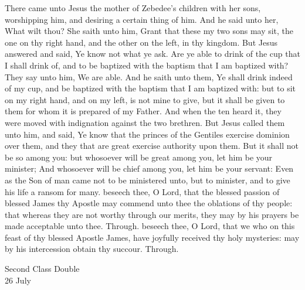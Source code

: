\vspace{0.5ex}
\vspace{-1ex}
 There came unto Jesus the mother of Zebedee's children with her sons, worshipping him, and desiring a certain thing of him. And he said unto her, What wilt thou? She saith unto him, Grant that these my two sons may sit, the one on thy right hand, and the other on the left, in thy kingdom. But Jesus answered and said, Ye know not what ye ask. Are ye able to drink of the cup that I shall drink of, and to be baptized with the baptism that I am baptized with? They say unto him, We are able. And he saith unto them, Ye shall drink indeed of my cup, and be baptized with the baptism that I am baptized with: but to sit on my right hand, and on my left, is not mine to give, but it shall be given to them for whom it is prepared of my Father. And when the ten heard it, they were moved with indignation against the two brethren. But Jesus called them unto him, and said, Ye know that the princes of the Gentiles exercise dominion over them, and they that are great exercise authority upon them. But it shall not be so among you: but whosoever will be great among you, let him be your minister; And whosoever will be chief among you, let him be your servant: Even as the Son of man came not to be ministered unto, but to minister, and to give his life a ransom for many.
\secret
{} beseech thee, O Lord, that the blessed passion of blessed James thy Apostle may commend unto thee the oblations of thy people: that whereas they are not worthy through our merits, they may by his prayers be made acceptable unto thee. Through.
\postcommunion
{} beseech thee, O Lord, that we who on this feast of thy blessed Apostle James, have joyfully received thy holy mysteries: may by his intercession obtain thy succour. Through.

\begin{inhead}
    {Second Class Double\\
26 July}
\end{inhead}
\par\noindent
{}

